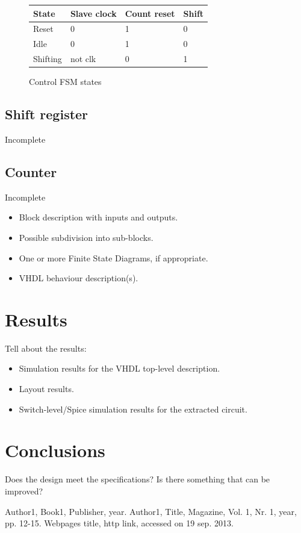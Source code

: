 \documentclass[11pt,twoside,a4paper]{article}
\begin{document}
\begin{figure}
\begin{center}
    \begin{tabular}{ | l | l | l | l |}
    \hline
    State & Slave clock & Count reset & Shift \\ \hline
    Reset & 0 & 1 & 0 \\ \hline
    Idle & 0 & 1 & 0 \\ \hline
    Shifting & not clk  & 0 & 1 \\
    \hline
    \end{tabular}
\end{center}
\caption{Control FSM states}
\label{control-states}
\end{figure}

\subsection{Shift register}
Incomplete
\subsection{Counter}
Incomplete
\begin{itemize}
\item
Block description with inputs and outputs.
\item
Possible subdivision into sub-blocks.
\item
One or more Finite State Diagrams, if appropriate.
\item
VHDL behaviour description(s).
\end{itemize}

\section{Results}
Tell about the results:
\begin{itemize}
\item
Simulation results for the VHDL top-level description.
\item
Layout results.
\item
Switch-level/Spice simulation results for the extracted circuit.
\end{itemize}

\section{Conclusions}
Does the design meet the specifications?
Is there something that can be improved?

\begin{thebibliography}{9}
Author1, 
Book1, 
Publisher, 
year.
Author1, 
Title, 
Magazine, 
Vol. 1, 
Nr. 1, 
year, 
pp. 12-15.
Webpages title, 
http link, 
accessed on 19 sep. 2013.
\end{thebibliography}
\end{document}

